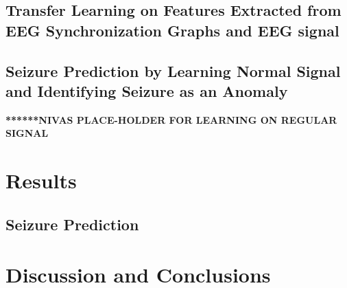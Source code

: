 \documentclass{article} %
\newcommand{\BibDir}{./bibliography}
\begin{document}
\subsection{Transfer Learning on Features Extracted from EEG Synchronization Graphs and EEG signal}

\subsection{Seizure Prediction by Learning Normal Signal and Identifying Seizure as an Anomaly} \label{sec:seizure_predict_method}
\textbf{******NIVAS PLACE-HOLDER FOR LEARNING ON REGULAR SIGNAL }
\section{Results} \label{sec:results}

\subsection{Seizure Prediction}

\section{Discussion and Conclusions} \label{sec:discuss}



\end{document}
